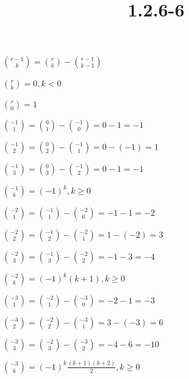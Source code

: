 \documentclass{article}
\title{1.2.6-6}
\begin{document}
\maketitle

$\binom{r-1}{k} = \binom{r}{k} - \binom{r-1}{k-1}$

$\binom{r}{k} = 0, k < 0$

$\binom{r}{0} = 1$

$\binom{-1}{1} = \binom{0}{1} - \binom{-1}{0} = 0 - 1 = -1$

$\binom{-1}{2} = \binom{0}{2} - \binom{-1}{1} = 0 - (-1) = 1$

$\binom{-1}{3} = \binom{0}{3} - \binom{-1}{2} = 0 - 1 = -1$

$\binom{-1}{k} = (-1)^k, k \geq 0$

$\binom{-2}{1} = \binom{-1}{1} - \binom{-2}{0} = -1 - 1 = -2$

$\binom{-2}{2} = \binom{-1}{2} - \binom{-2}{1} = 1 - (-2) = 3$

$\binom{-2}{3} = \binom{-1}{3} - \binom{-2}{2} = -1 - 3 = -4$

$\binom{-2}{k} = (-1)^k (k + 1), k \geq 0$

$\binom{-3}{1} = \binom{-2}{1} - \binom{-3}{0} = -2 - 1 = -3$

$\binom{-3}{2} = \binom{-2}{2} - \binom{-3}{1} = 3 - (-3) = 6$

$\binom{-3}{3} = \binom{-2}{3} - \binom{-3}{2} = -4 - 6 = -10$

$\binom{-3}{k} = (-1)^k \frac{(k + 1)(k + 2)}{2}, k \geq 0$
\end{document}
